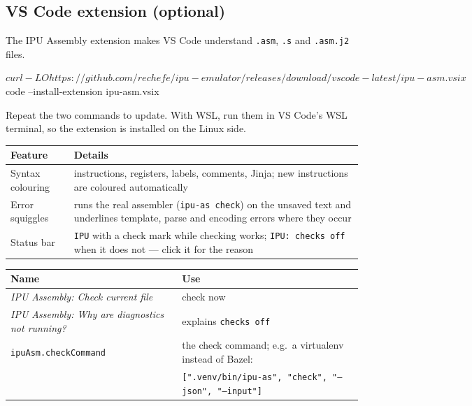 \documentclass[11pt,a4paper]{article}
\begin{document}
\subsection{VS Code extension (optional)}\label{sec:vscode}

The IPU Assembly extension makes VS Code understand \texttt{.asm},
\texttt{.s} and \texttt{.asm.j2} files.

\begin{termcmd}
$ curl -LO https://github.com/rechefe/ipu-emulator/releases/download/vscode-latest/ipu-asm.vsix
$ code --install-extension ipu-asm.vsix
\end{termcmd}

Repeat the two commands to update. With WSL, run them in VS Code's WSL
terminal, so the extension is installed on the Linux side.

\begin{center}
\begin{tabularx}{\linewidth}{lX}
\toprule
Feature & Details \\
\midrule
Syntax colouring & instructions, registers, labels, comments, Jinja; new instructions are coloured automatically \\
Error squiggles & runs the real assembler (\texttt{ipu-as check}) on the unsaved text and underlines template, parse and encoding errors where they occur \\
Status bar & \texttt{IPU} with a check mark while checking works; \texttt{IPU: checks off} when it does not --- click it for the reason \\
\bottomrule
\end{tabularx}
\end{center}

\begin{center}
\begin{tabularx}{\linewidth}{lX}
\toprule
Name & Use \\
\midrule
\textit{IPU Assembly: Check current file} & check now \\
\textit{IPU Assembly: Why are diagnostics not running?} & explains \texttt{checks off} \\
\texttt{ipuAsm.checkCommand} & the check command; e.g.\ a virtualenv instead of Bazel: \\
 & \texttt{[".venv/bin/ipu-as", "check", "--json", "--input"]} \\
\bottomrule
\end{tabularx}
\end{center}
\end{document}
